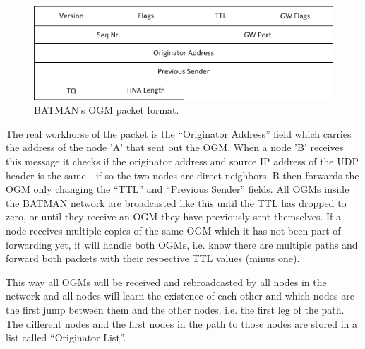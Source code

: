 \begin{figure}[h]
	\centering
  	\includegraphics[width=\textwidth]{images/original_ogm.png}
  	\caption{BATMAN's \acf{OGM} packet format.}
	\label{fig:original_ogm}
\end{figure}

The real workhorse of the packet is the ``Originator Address'' field which
carries the address of the node 'A' that sent out the \ac{OGM}. When a node 'B'
receives this message it checks if the originator address and source IP address
of the UDP header is the same - if so the two nodes are direct neighbors. B then
forwards the \ac{OGM} only changing the ``\ac{TTL}'' and ``Previous Sender''
fields. All \acp{OGM} inside the BATMAN network are broadcasted like this until the
TTL has dropped to zero, or until they receive an \ac{OGM} they have
previously sent themselves. If a node receives multiple copies of the same
\ac{OGM} which it has not been part of forwarding yet, it will handle both
\acp{OGM}, i.e. know there are multiple paths and forward both packets with
their respective \ac{TTL} values (minus one).

This way all \acp{OGM} will be received and rebroadcasted by all nodes in the
network and all nodes will learn the existence of each other and which nodes are
the first jump between them and the other nodes, i.e. the first leg of the path.
The different nodes and the first nodes in the path to those nodes are stored in
a list called ``Originator List''.


